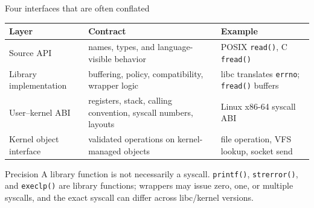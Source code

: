 \documentclass[aspectratio=169,11pt]{beamer}
\newcommand{\code}[1]{\texttt{#1}}
\begin{document}
\begin{frame}{Four interfaces that are often conflated}
  \small
  \begin{tabularx}{\textwidth}{@{}lXX@{}}
    \toprule
    \textbf{Layer} & \textbf{Contract} & \textbf{Example} \\
    \midrule
    Source API & names, types, and language-visible behavior & POSIX \code{read()}, C \code{fread()} \\
    Library implementation & buffering, policy, compatibility, wrapper logic & libc translates \code{errno}; \code{fread()} buffers \\
    User--kernel ABI & registers, stack, calling convention, syscall numbers, layouts & Linux x86-64 syscall ABI \\
    Kernel object interface & validated operations on kernel-managed objects & file operation, VFS lookup, socket send \\
    \bottomrule
  \end{tabularx}
  \vspace{0.5em}
  \begin{alertblock}{Precision}
    A library function is not necessarily a syscall. \code{printf()}, \code{strerror()}, and \code{execlp()} are library functions; wrappers may issue zero, one, or multiple syscalls, and the exact syscall can differ across libc/kernel versions.
  \end{alertblock}
\end{frame}
\end{document}
